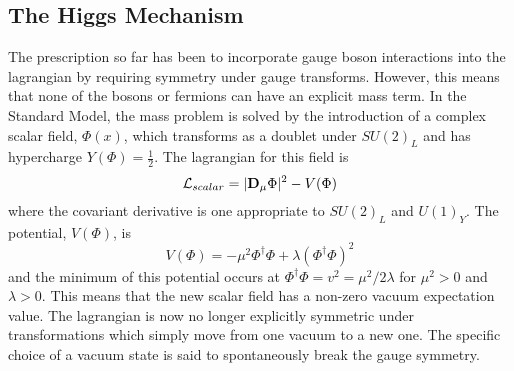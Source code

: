 \subsection{The Higgs Mechanism}

The prescription so far has been to incorporate gauge boson interactions into the lagrangian by requiring symmetry under gauge transforms. However, this means that none of the bosons or fermions can have an explicit mass term. %
In the Standard Model, the mass problem is solved by the introduction of a complex scalar field, $\Phi(x)$, which transforms as a doublet under $SU(2)_L$ and has hypercharge $Y(\Phi)=\frac{1}{2}$. The lagrangian for this field is 
\begin{equation}
\mathcal{L}_{scalar} = |\bold{D}_{\mu}\Phi|^2 - V(\Phi)
\end{equation}
where the covariant derivative is one appropriate to $SU(2)_L$ and $U(1)_Y$. The potential, $V(\Phi)$, is 
\begin{equation}\label{scalarpotential}
V(\Phi) = -\mu^2\Phi^{\dagger}\Phi +
\lambda\left(\Phi^{\dagger}\Phi\right)^2 
\end{equation}
and the minimum of this potential occurs at $\Phi^{\dagger}\Phi =  v^2 = \mu^2 / 2\lambda$ for $\mu^2 > 0$ and $\lambda > 0$. This means that the  new scalar field has a non-zero vacuum expectation value. The lagrangian is now no longer explicitly symmetric under transformations which simply move from one vacuum to a new one. The specific choice of a vacuum state is said to spontaneously break the gauge symmetry. 


